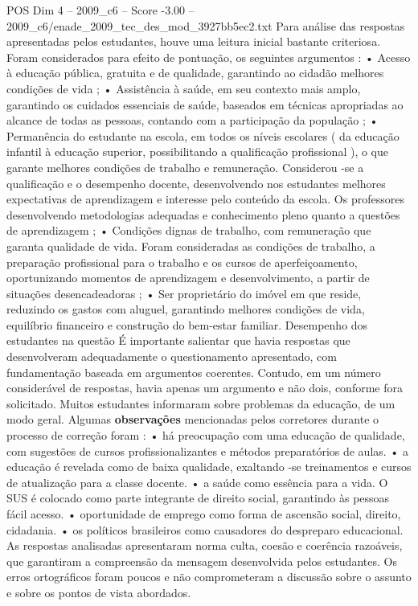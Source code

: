 \begin{textsample}{POS Dim 4 – 2009\_c6 – Score -3.00 – 2009\_c6/enade\_2009\_tec\_des\_mod\_3927bb5ec2.txt}
Para análise das respostas apresentadas pelos estudantes, houve uma leitura inicial bastante criteriosa.
Foram considerados para efeito de pontuação, os seguintes argumentos : • Acesso à educação pública, gratuita e de qualidade, garantindo ao cidadão melhores condições de vida ; • Assistência à saúde, em seu contexto mais amplo, garantindo os cuidados essenciais de saúde, baseados em técnicas apropriadas ao alcance de todas as pessoas, contando com a participação da população ; • Permanência do estudante na escola, em todos os níveis escolares ( da educação infantil à educação superior, possibilitando a qualificação profissional ), o que garante melhores condições de trabalho e remuneração.
Considerou -se a qualificação e o desempenho docente, desenvolvendo nos estudantes melhores expectativas de aprendizagem e interesse pelo conteúdo da escola.
Os professores desenvolvendo metodologias adequadas e conhecimento pleno quanto a questões de aprendizagem ; • Condições dignas de trabalho, com remuneração que garanta qualidade de vida.
Foram consideradas as condições de trabalho, a preparação profissional para o trabalho e os cursos de aperfeiçoamento, oportunizando momentos de aprendizagem e desenvolvimento, a partir de situações desencadeadoras ; • Ser proprietário do imóvel em que reside, reduzindo os gastos com aluguel, garantindo melhores condições de vida, equilíbrio financeiro e construção do bem-estar familiar.
Desempenho dos estudantes na questão É importante salientar que havia respostas que desenvolveram adequadamente o questionamento apresentado, com fundamentação baseada em argumentos coerentes.
Contudo, em um número considerável de respostas, havia apenas um argumento e não dois, conforme fora solicitado.
Muitos estudantes informaram sobre problemas da educação, de um modo geral.
Algumas \textbf{observações} mencionadas pelos corretores durante o processo de correção foram : • há preocupação com uma educação de qualidade, com sugestões de cursos profissionalizantes e métodos preparatórios de aulas. • a educação é revelada como de baixa qualidade, exaltando -se treinamentos e cursos de atualização para a classe docente. • a saúde como essência para a vida.
O SUS é colocado como parte integrante de direito social, garantindo às pessoas fácil acesso. • oportunidade de emprego como forma de ascensão social, direito, cidadania. • os políticos brasileiros como causadores do despreparo educacional.
As respostas analisadas apresentaram norma culta, coesão e coerência razoáveis, que garantiram a compreensão da mensagem desenvolvida pelos estudantes.
Os erros ortográficos foram poucos e não comprometeram a discussão sobre o assunto e sobre os pontos de vista abordados.

\end{textsample}

